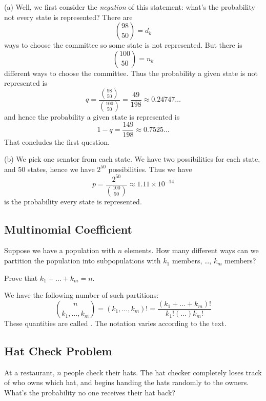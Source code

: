 (a) Well, we first consider the \emph{negation} of this statement: what's
the probability not every state is represented? There are
\begin{equation}
\binom{98}{50} = d_{k}
\end{equation}
ways to choose the committee so some state is not represented. But there
is 
\begin{equation}
\binom{100}{50}=n_{k}
\end{equation}
different ways to choose the committee. Thus the probability a given state is
not represented is
\begin{equation}
q = \frac{\displaystyle\binom{98}{50}}{\displaystyle\binom{100}{50}} = \frac{49}{198}\approx 0.24747\dots
\end{equation}
and hence the probability a given state is represented is
\begin{equation}
1-q = \frac{149}{198} \approx 0.7525\dots
\end{equation}
That concludes the first question.

(b)
We pick one senator from each state. We have two possibilities for each
state, and 50 states, hence we have $2^{50}$ possibilities. Thus we have
\begin{equation}
p = \frac{2^{50}}{\displaystyle\binom{100}{50}} \approx 1.11\times10^{-14}
\end{equation}
is the probability every state is represented.


\subsection{Multinomial Coefficient}
\M
Suppose we have a population with $n$ elements. How many different ways
can we partition the population into subpopulations with $k_1$
members, \dots, $k_m$ members?

\begin{xca}
Prove that $k_1+\dots+k_m=n$.
\end{xca}

We have the following number of such partitions:
\begin{equation}
\binom{n}{k_1,\dots,k_m} = (k_1,\dots,k_m)! = \frac{(k_1+\dots+k_m)!}{k_1!(\dots)k_m!}
\end{equation}
These quantities are called .
The notation varies according to the text. 

\subsection{Hat Check Problem}
At a restaurant, $n$ people check their hats.
The hat checker completely loses track of who owns which hat, and begins
handing the hats randomly to the owners. What's the probability no one
receives their hat back?

